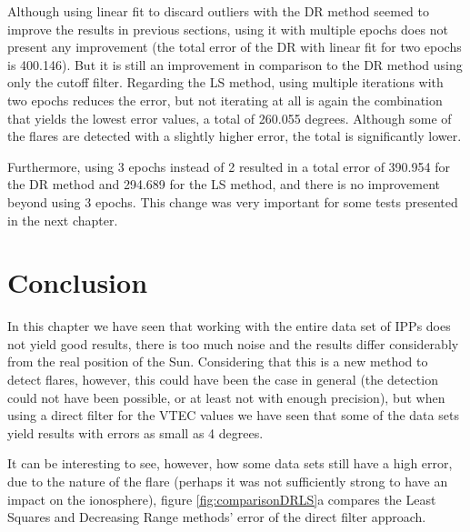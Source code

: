 Although using linear fit to discard outliers with the DR method seemed to improve the results in previous sections, using it with multiple epochs does not present any improvement (the total error of the DR with linear fit for two epochs is 400.146). But it is still an improvement in comparison to the DR method using only the cutoff filter. Regarding the LS method, using multiple iterations with two epochs reduces the error, but not iterating at all is again the combination that yields the lowest error values, a total of 260.055 degrees. Although some of the flares are detected with a slightly higher error, the total is significantly lower.

Furthermore, using 3 epochs instead of 2 resulted in a total error of 390.954 for the DR method and 294.689 for the LS method, and there is no improvement beyond using 3 epochs. This change was very important for some tests presented in the next chapter.

\clearpage

\section{Conclusion}

In this chapter we have seen that working with the entire data set of IPPs does not yield good results, there is too much noise and the results differ considerably from the real position of the Sun. Considering that this is a new method to detect flares, however, this could have been the case in general (the detection could not have been possible, or at least not with enough precision), but when using a direct filter for the VTEC values we have seen that some of the data sets yield results with errors as small as 4 degrees.

It can be interesting to see, however, how some data sets still have a high error, due to the nature of the flare (perhaps it was not sufficiently strong to have an impact on the ionosphere), figure \ref{fig:comparisonDRLS}a compares the Least Squares and Decreasing Range methods' error of the direct filter approach.

